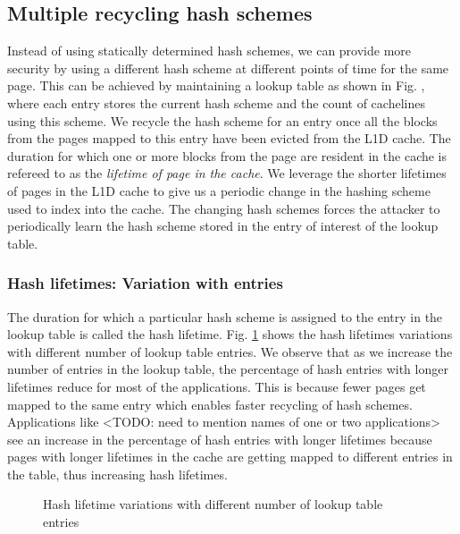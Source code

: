 \subsection{Multiple recycling hash schemes}
Instead of using statically determined hash schemes, we can provide more security by using a different hash scheme at different points of time for the same page. This can be achieved by maintaining a lookup table as shown in Fig. \cite{figure:changing_schemes}, where each entry stores the current hash scheme and the count of cachelines using this scheme. We recycle the hash scheme for an entry once all the blocks from the pages mapped to this entry have been evicted from the L1D cache. The duration for which one or more blocks from the page are resident in the cache is refereed to as the \textit{lifetime of page in the cache}. We leverage the shorter lifetimes of pages in the L1D cache to give us a periodic change in the hashing scheme used to index into the cache. The changing hash schemes forces the attacker to periodically learn the hash scheme stored in the entry of interest of the lookup table.

\subsubsection{Hash lifetimes: Variation with entries}
The duration for which a particular hash scheme is assigned to the entry in the lookup table is called the hash lifetime. Fig. \ref{figure:Hash_lifetime} shows the hash lifetimes variations with different number of lookup table entries. We observe that as we increase the number of entries in the lookup table, the percentage of hash entries with longer lifetimes reduce for most of the applications. This is because fewer pages get mapped to the same entry which enables faster recycling of hash schemes. Applications like <TODO: need to mention names of one or two applications> see an increase in the percentage of hash entries with longer lifetimes because pages with longer lifetimes in the cache are getting mapped to different entries in the table, thus increasing hash lifetimes.
\begin{figure}
  \caption{Hash lifetime variations with different number of lookup table entries}
  \label{figure:Hash_lifetime}
\end{figure}

